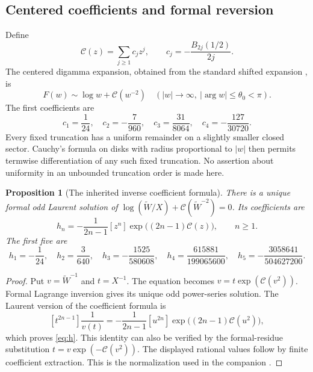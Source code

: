 \documentclass[11pt,a4paper]{article}
\newtheorem{proposition}[proposition]{Proposition}
\theoremstyle{definition}
\numberwithin{equation}{section}
\newcommand{\coef}[2]{[#1^{#2}]}
\newcommand{\cformal}{\mathscr C}
\newcommand{\Wformal}{\widetilde W}
\begin{document}
\subsection{Centered coefficients and formal reversion}
Define
\begin{equation}
 \cformal(z)=\sum_{j\ge1}c_jz^j,\qquad
 c_j=-\frac{B_{2j}(1/2)}{2j}.
 \label{eq:c}
\end{equation}
The centered digamma expansion, obtained from the standard shifted
expansion \cite{dlmf511}, is
\begin{equation}
 F(w)\sim\log w+\cformal(w^{-2})
 \quad (|w|\to\infty,\ |\arg w|\le\theta_0<\pi).
 \label{eq:centered}
\end{equation}
The first coefficients are
\begin{equation}
 c_1=\frac1{24},\quad c_2=-\frac7{960},\quad
 c_3=\frac{31}{8064},\quad c_4=-\frac{127}{30720}.
 \label{eq:cfirst}
\end{equation}
Every fixed truncation has a uniform remainder on a slightly smaller
closed sector. Cauchy's formula on disks with radius proportional to
$|w|$ then permits termwise differentiation of any such fixed truncation.
No assertion about uniformity in an unbounded truncation order is made here.

\begin{proposition}[The inherited inverse coefficient formula]
\label{prop:coefficients}
There is a unique formal odd Laurent solution of
$\log(\Wformal/X)+\cformal(\Wformal^{-2})=0$. Its coefficients are
\begin{equation}
 h_n=-\frac1{2n-1}\coef{z}{n}
       \exp\bigl((2n-1)\cformal(z)\bigr),\qquad n\ge1.
 \label{eq:h}
\end{equation}
The first five are
\begin{equation}
 h_1=-\frac1{24},\quad h_2=\frac3{640},\quad
 h_3=-\frac{1525}{580608},\quad
 h_4=\frac{615881}{199065600},\quad
 h_5=-\frac{3058641}{504627200}.
 \label{eq:hfirst}
\end{equation}
\end{proposition}
\begin{proof}
Put $v=\Wformal^{-1}$ and $t=X^{-1}$. The equation becomes
$v=t\exp(\cformal(v^2))$. Formal Lagrange inversion gives its unique odd
power-series solution. The Laurent version of the coefficient formula is
\[
 \coef{t}{2n-1}\frac1{v(t)}
 =-\frac1{2n-1}\coef{u}{2n}
       \exp\bigl((2n-1)\cformal(u^2)\bigr),
\]
which proves \eqref{eq:h}. This identity can also be verified by the
formal-residue substitution $t=v\exp(-\cformal(v^2))$.
The displayed rational values follow by finite coefficient extraction.
This is the normalization used in the companion \cite{companion}.
\end{proof}
\end{document}
